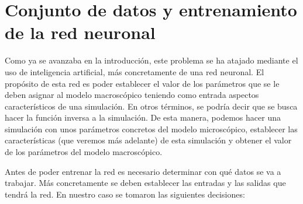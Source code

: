 \section{Conjunto de datos y entrenamiento de la red neuronal}

Como ya se avanzaba en la introducción, este problema se ha atajado mediante el uso de inteligencia artificial, más concretamente de una red neuronal. El propósito de esta red es poder establecer el valor de los parámetros que se le deben asignar al modelo macroscópico teniendo como entrada aspectos característicos de una simulación. En otros términos, se podría decir que se busca hacer la función inversa a la simulación. De esta manera, podemos hacer una simulación con unos parámetros concretos del modelo microscópico, establecer las características (que veremos más adelante) de esta simulación y obtener el valor de los parámetros del modelo macroscópico. 

Antes de poder entrenar la red es necesario determinar con qué datos se va a trabajar. Más concretamente se deben establecer las entradas y las salidas que tendrá la red. En nuestro caso se tomaron las siguientes decisiones:



